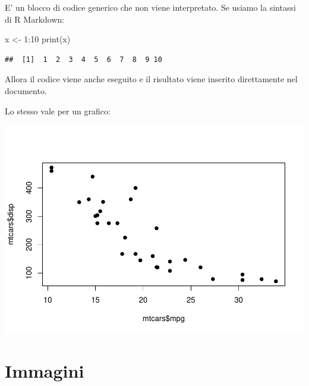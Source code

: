 \documentclass[
]{article}
\newenvironment{Shaded}{\begin{snugshade}}{\end{snugshade}}
\newcommand{\AttributeTok}[1]{\textcolor[rgb]{0.77,0.63,0.00}{#1}}
\newcommand{\DecValTok}[1]{\textcolor[rgb]{0.00,0.00,0.81}{#1}}
\newcommand{\FunctionTok}[1]{\textcolor[rgb]{0.00,0.00,0.00}{#1}}
\newcommand{\NormalTok}[1]{#1}
\newcommand{\OtherTok}[1]{\textcolor[rgb]{0.56,0.35,0.01}{#1}}
\newcommand{\SpecialCharTok}[1]{\textcolor[rgb]{0.00,0.00,0.00}{#1}}
\begin{document}
E' un blocco di codice generico che non viene interpretato. Se usiamo la sintassi di R Markdown:

\begin{Shaded}
\begin{Highlighting}[]
\NormalTok{x }\OtherTok{\textless{}{-}} \DecValTok{1}\SpecialCharTok{:}\DecValTok{10}
\FunctionTok{print}\NormalTok{(x)}
\end{Highlighting}
\end{Shaded}

\begin{verbatim}
##  [1]  1  2  3  4  5  6  7  8  9 10
\end{verbatim}

Allora il codice viene anche eseguito e il risultato viene inserito direttamente nel documento.

Lo stesso vale per un grafico:

\begin{Shaded}
\end{Shaded}

\includegraphics{example-bookdown_files/figure-latex/unnamed-chunk-2-1.pdf}

\hypertarget{immagini}{%
\section{Immagini}\label{immagini}}
\end{document}
